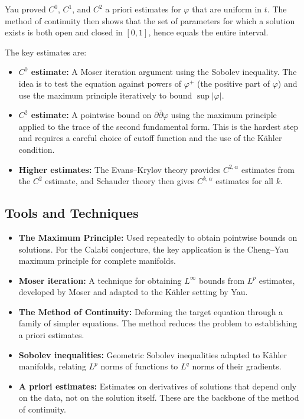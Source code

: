 Yau proved $C^0$, $C^1$, and $C^2$ a priori estimates for $\varphi$ that are uniform in $t$. The method of continuity then shows that the set of parameters for which a solution exists is both open and closed in $[0,1]$, hence equals the entire interval.

The key estimates are:
\begin{itemize}
    \item \textbf{$C^0$ estimate:} A Moser iteration argument using the Sobolev inequality. The idea is to test the equation against powers of $\varphi^+$ (the positive part of $\varphi$) and use the maximum principle iteratively to bound $\sup |\varphi|$.
    \item \textbf{$C^2$ estimate:} A pointwise bound on $\partial\bar\partial\varphi$ using the maximum principle applied to the trace of the second fundamental form. This is the hardest step and requires a careful choice of cutoff function and the use of the K\"ahler condition.
    \item \textbf{Higher estimates:} The Evans--Krylov theory provides $C^{2,\alpha}$ estimates from the $C^2$ estimate, and Schauder theory then gives $C^{k,\alpha}$ estimates for all $k$.
\end{itemize}

\subsection{Tools and Techniques}

\begin{itemize}
    \item \textbf{The Maximum Principle:} Used repeatedly to obtain pointwise bounds on solutions. For the Calabi conjecture, the key application is the Cheng--Yau maximum principle for complete manifolds.
    \item \textbf{Moser iteration:} A technique for obtaining $L^\infty$ bounds from $L^p$ estimates, developed by Moser and adapted to the K\"ahler setting by Yau.
    \item \textbf{The Method of Continuity:} Deforming the target equation through a family of simpler equations. The method reduces the problem to establishing a priori estimates.
    \item \textbf{Sobolev inequalities:} Geometric Sobolev inequalities adapted to K\"ahler manifolds, relating $L^p$ norms of functions to $L^q$ norms of their gradients.
    \item \textbf{A priori estimates:} Estimates on derivatives of solutions that depend only on the data, not on the solution itself. These are the backbone of the method of continuity.
\end{itemize}

